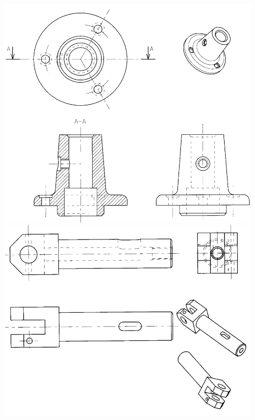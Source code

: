 \documentclass[10pt,fleqn]{article} %
\begin{document}

\vspace{7cm}
\pagestyle{fancy}
\thispagestyle{plain}


\def\columnseprulecolor{\color{ocre}}
\setlength{\columnseprule}{0.4pt} 

\ifprof
\begin{center}
\includegraphics[width=.8\linewidth]{images/corr_01}
\includegraphics[width=.8\linewidth]{images/corr_02}
\end{center}
\end{document}
